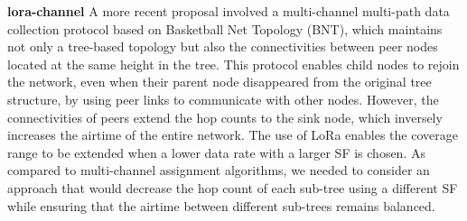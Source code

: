  \cite{fu_stochastic_2013}    \newline 
 \cite{lacage_ieee_2004}    \newline 
 \cite{lin_atpc_2006}    \newline 
 \cite{monks_power_2001}    \newline 
 \cite{nguyen_practical_2011}    \newline 
 \cite{noauthor_survey_2013}    \newline 
 \cite{pefkianakis_window-based_2013}    \newline 
 \cite{ramachandran_symphony_2010}    \newline 
 \cite{wong_robust_2006}    \newline 
 \cite{zimmerling_ptunes_2012}    \newline 
\textbf{lora-channel} \newline  \cite{liew_fast_2018}   A more recent proposal \cite{liew_fast_2018} involved a multi-channel multi-path data collection protocol based on Basketball Net Topology (BNT), which maintains not only a tree-based topology but also the connectivities between peer nodes located at the same height in the tree. This protocol enables child nodes to rejoin the network, even when their parent node disappeared from the original tree structure, by using peer links to communicate with other nodes. However, the connectivities of peers extend the hop counts to the sink node, which inversely increases the airtime of the entire network. The use of LoRa enables the coverage range to be extended when a lower data rate with a larger SF is chosen. As compared to multi-channel assignment algorithms, we needed to consider an approach that would decrease the hop count of each sub-tree using a different SF while ensuring that the airtime between different sub-trees remains balanced.~   \newline 
